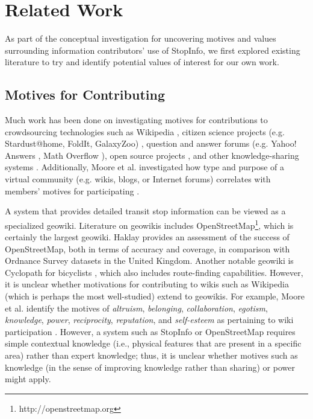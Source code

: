 \section{Related Work}
\label{sec:related-work}
As part of the conceptual investigation for uncovering motives and values surrounding information contributors' use of StopInfo, we first explored existing literature to try and identify potential values of interest for our own work.

\subsection{Motives for Contributing}
Much work has been done on investigating motives for contributions to crowdsourcing technologies such as Wikipedia \cite{oreg-2008, schroer-2009}, citizen science projects (e.g. Stardust@home, FoldIt, GalaxyZoo) \cite{eveleigh-2014, nov-2011, prestopnik-2011, reed-2013}, question and answer forums (e.g. Yahoo! Answers \cite{dearman-2010}, Math Overflow \cite{tausczik-2012}), open source projects \cite{oreg-2008, wu-2007}, and other knowledge-sharing systems \cite{miller-2007}. Additionally, Moore et al. investigated how type and purpose of a virtual community (e.g. wikis, blogs, or Internet forums) correlates with members' motives for participating \cite{moore-2007}. 

A system that provides detailed transit stop information can be
viewed as a specialized geowiki.  Literature on geowikis includes 
OpenStreetMap\footnote{http://openstreetmap.org}, which
is certainly the largest geowiki. Haklay
\cite{haklay-environment-planning-b-2010} provides an assessment of
the success of OpenStreetMap, both in terms of accuracy and coverage,
in comparison with Ordnance Survey datasets in the United 
Kingdom. Another notable geowiki is Cyclopath for bicyclists
\cite{panciera-chi-2010,priedhorsky-wikisym-2007},
which also includes route-finding capabilities. However, it is unclear whether motivations for contributing to wikis such as Wikipedia (which is perhaps the most well-studied) extend to geowikis. For example, Moore et al. identify the motives of \emph{altruism}, \emph{belonging}, \emph{collaboration}, \emph{egotism}, \emph{knowledge}, \emph{power}, \emph{reciprocity}, \emph{reputation}, and \emph{self-esteem} as pertaining to wiki participation \cite{moore-2007}. However, a system such as StopInfo or OpenStreetMap requires simple contextual knowledge (i.e., physical features that are present in a specific area) rather than expert knowledge; thus, it is unclear whether motives such as knowledge (in the sense of improving knowledge rather than sharing) or power might apply. 

